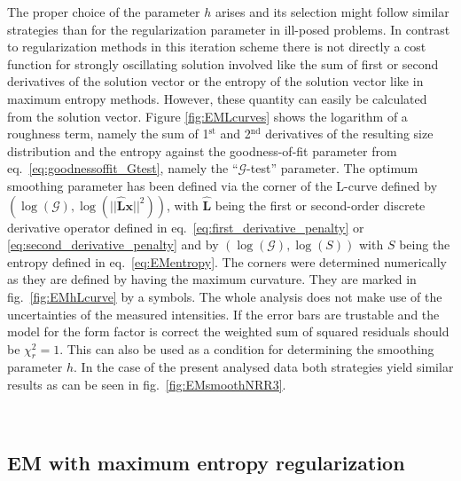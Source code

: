 The proper choice of the parameter $h$ arises and its selection might follow similar strategies than for the regularization parameter in ill-posed problems. In contrast to regularization methods in this iteration scheme there is not directly a cost function for strongly oscillating solution involved like the sum of first or second derivatives of the solution vector or the entropy of the solution vector like in maximum entropy methods. However, these quantity can easily be calculated from the solution vector. Figure \ref{fig:EMLcurves} shows the logarithm of a roughness term, namely the sum of 1$^\mathrm{st}$ and 2$^\mathrm{nd}$ derivatives of the resulting size distribution and the entropy against the goodness-of-fit parameter from eq.\ \ref{eq:goodnessoffit_Gtest}, namely the ``$\mathcal{G}$-test'' parameter. The optimum smoothing parameter has been defined via the corner of the L-curve defined by $(\log(\mathcal{G}),\log(|| \hat{\mathbf{L}} \mathbf{x} ||^2))$, with $\hat{\mathbf{L}}$ being the first or second-order discrete derivative operator defined in eq.\ \ref{eq:first_derivative_penalty} or \ref{eq:second_derivative_penalty} and by $(\log(\mathcal{G}),\log(S))$ with $S$ being the entropy defined in eq.\ \ref{eq:EMentropy}. The corners were determined numerically as they are defined by having the maximum curvature. They are marked in fig.\ \ref{fig:EMhLcurve} by a symbols. The whole analysis does not make use of the uncertainties of the measured intensities. If the error bars are trustable and the model for the form factor is correct the weighted sum of squared residuals should be $\chi_r^2= 1$. This can also be used as a condition for determining the smoothing parameter $h$. In the case of the present analysed data both strategies yield similar results as can be seen in fig.\ \ref{fig:EMsmoothNRR3}.

~\\

\subsection{EM with maximum entropy regularization}~\\

